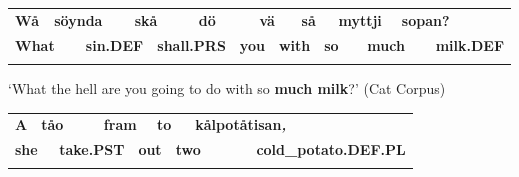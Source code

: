 \begin{tabular}{llllllllllllllll}
\lsptoprule
{\bfseries Wå} & \multicolumn{2}{l}{{\bfseries söynda}

} & \multicolumn{2}{l}{{\bfseries skå}

} & \multicolumn{2}{l}{{\bfseries dö}

} & \multicolumn{2}{l}{{\bfseries vä}

} & \multicolumn{2}{l}{{\bfseries så}

} & \multicolumn{2}{l}{{\bfseries myttji}

} & \multicolumn{2}{l}{{\bfseries sopan?}

} & \\
\multicolumn{2}{l}{{\bfseries What}

} & \multicolumn{2}{l}{{\bfseries sin.DEF}

} & \multicolumn{2}{l}{{\bfseries shall.PRS}

} & \multicolumn{2}{l}{{\bfseries you}

} & \multicolumn{2}{l}{{\bfseries with}

} & \multicolumn{2}{l}{{\bfseries so}

} & \multicolumn{2}{l}{{\bfseries much}

} & \multicolumn{2}{l}{{\bfseries milk.DEF}

}\\
\lspbottomrule
\end{tabular}

\begin{styleTranslation}
‘What the hell are you going to do with so \textbf{much milk}?’ (Cat Corpus)

\end{styleTranslation}

\begin{tabular}{llllllllll}
\lsptoprule
{\bfseries A} & \multicolumn{2}{l}{{\bfseries tåo}

} & \multicolumn{2}{l}{{\bfseries fram}

} & \multicolumn{2}{l}{{\bfseries to}

} & \multicolumn{2}{l}{\textbf{kålpotåtisan}\textbf{\textit{,}}

} & \\
\multicolumn{2}{l}{{\bfseries she}

} & \multicolumn{2}{l}{{\bfseries take.PST}

} & \multicolumn{2}{l}{{\bfseries out}

} & \multicolumn{2}{l}{{\bfseries two}

} & \multicolumn{2}{l}{{\bfseries cold\_potato.DEF.PL}

}\\
\lspbottomrule
\end{tabular}

